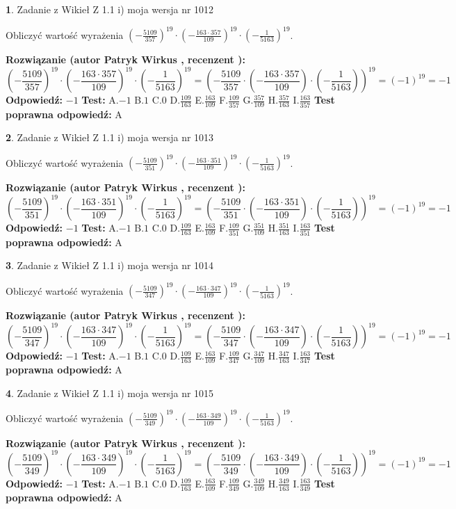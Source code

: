 \documentclass[12pt, a4paper]{article}
\theoremstyle{definition} %
\newtheorem{zad}{}
\newcommand{\zadStart}[1]{\begin{zad}#1\newline}
\newcommand{\zadStop}{\end{zad}}
\newcommand{\rozwStart}[2]{\noindent \textbf{Rozwiązanie (autor #1 , recenzent #2): }\newline}
\newcommand{\rozwStop}{\newline}
\newcommand{\odpStart}{\noindent \textbf{Odpowiedź:}\newline}
\newcommand{\odpStop}{\newline}
\newcommand{\testStart}{\noindent \textbf{Test:}\newline}
\newcommand{\testStop}{\newline}
\newcommand{\kluczStart}{\noindent \textbf{Test poprawna odpowiedź:}\newline}
\newcommand{\kluczStop}{\newline}
\begin{document}
\zadStart{Zadanie z Wikieł Z 1.1 i) moja wersja nr 1012}

Obliczyć wartość wyrażenia $(-\frac{5109}{357})^{19} \cdot (-\frac{163 \cdot 357}{109})^{19} \cdot (-\frac{1}{5163})^{19}$.
\zadStop
\rozwStart{Patryk Wirkus}{}
$$(-\frac{5109}{357})^{19} \cdot (-\frac{163 \cdot 357}{109})^{19} \cdot (-\frac{1}{5163})^{19} = (-\frac{5109}{357} \cdot (-\frac{163 \cdot 357}{109}) \cdot (-\frac{1}{5163}))^{19} = (-1)^{19} = -1$$
\rozwStop
\odpStart
$-1$
\odpStop
\testStart
A.$-1$ B.$1$ C.$0$ D.$\frac{109}{163}$ E.$\frac{163}{109}$
F.$\frac{109}{357}$ G.$\frac{357}{109}$
H.$\frac{357}{163}$
I.$\frac{163}{357}$
\testStop
\kluczStart
A
\kluczStop



\zadStart{Zadanie z Wikieł Z 1.1 i) moja wersja nr 1013}

Obliczyć wartość wyrażenia $(-\frac{5109}{351})^{19} \cdot (-\frac{163 \cdot 351}{109})^{19} \cdot (-\frac{1}{5163})^{19}$.
\zadStop
\rozwStart{Patryk Wirkus}{}
$$(-\frac{5109}{351})^{19} \cdot (-\frac{163 \cdot 351}{109})^{19} \cdot (-\frac{1}{5163})^{19} = (-\frac{5109}{351} \cdot (-\frac{163 \cdot 351}{109}) \cdot (-\frac{1}{5163}))^{19} = (-1)^{19} = -1$$
\rozwStop
\odpStart
$-1$
\odpStop
\testStart
A.$-1$ B.$1$ C.$0$ D.$\frac{109}{163}$ E.$\frac{163}{109}$
F.$\frac{109}{351}$ G.$\frac{351}{109}$
H.$\frac{351}{163}$
I.$\frac{163}{351}$
\testStop
\kluczStart
A
\kluczStop



\zadStart{Zadanie z Wikieł Z 1.1 i) moja wersja nr 1014}

Obliczyć wartość wyrażenia $(-\frac{5109}{347})^{19} \cdot (-\frac{163 \cdot 347}{109})^{19} \cdot (-\frac{1}{5163})^{19}$.
\zadStop
\rozwStart{Patryk Wirkus}{}
$$(-\frac{5109}{347})^{19} \cdot (-\frac{163 \cdot 347}{109})^{19} \cdot (-\frac{1}{5163})^{19} = (-\frac{5109}{347} \cdot (-\frac{163 \cdot 347}{109}) \cdot (-\frac{1}{5163}))^{19} = (-1)^{19} = -1$$
\rozwStop
\odpStart
$-1$
\odpStop
\testStart
A.$-1$ B.$1$ C.$0$ D.$\frac{109}{163}$ E.$\frac{163}{109}$
F.$\frac{109}{347}$ G.$\frac{347}{109}$
H.$\frac{347}{163}$
I.$\frac{163}{347}$
\testStop
\kluczStart
A
\kluczStop



\zadStart{Zadanie z Wikieł Z 1.1 i) moja wersja nr 1015}

Obliczyć wartość wyrażenia $(-\frac{5109}{349})^{19} \cdot (-\frac{163 \cdot 349}{109})^{19} \cdot (-\frac{1}{5163})^{19}$.
\zadStop
\rozwStart{Patryk Wirkus}{}
$$(-\frac{5109}{349})^{19} \cdot (-\frac{163 \cdot 349}{109})^{19} \cdot (-\frac{1}{5163})^{19} = (-\frac{5109}{349} \cdot (-\frac{163 \cdot 349}{109}) \cdot (-\frac{1}{5163}))^{19} = (-1)^{19} = -1$$
\rozwStop
\odpStart
$-1$
\odpStop
\testStart
A.$-1$ B.$1$ C.$0$ D.$\frac{109}{163}$ E.$\frac{163}{109}$
F.$\frac{109}{349}$ G.$\frac{349}{109}$
H.$\frac{349}{163}$
I.$\frac{163}{349}$
\testStop
\kluczStart
A
\kluczStop
\end{document}
